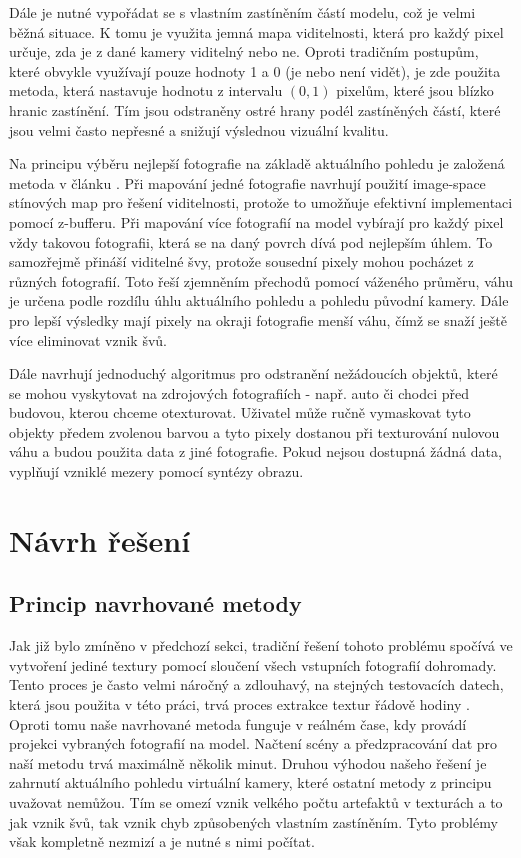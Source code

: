 \documentclass[11pt,twoside,a4paper]{book}
\begin{document}
Dále je nutné vypořádat se s vlastním zastíněním částí modelu, což je velmi
běžná situace. K tomu je využita jemná mapa viditelnosti, která pro každý pixel
určuje, zda je z dané kamery viditelný nebo ne. Oproti tradičním postupům, které
obvykle využívají pouze hodnoty 1 a 0 (je nebo není vidět), je zde použita
metoda, která nastavuje hodnotu z intervalu $(0,1)$ pixelům, které jsou blízko
hranic zastínění. Tím jsou odstraněny ostré hrany podél zastíněných částí, které
jsou velmi často nepřesné a snižují výslednou vizuální kvalitu.

Na principu výběru nejlepší fotografie na základě aktuálního pohledu je založená metoda v článku \cite{Debevec96}. Při mapování jedné fotografie navrhují použití image-space stínových map pro řešení viditelnosti, protože to umožňuje efektivní implementaci pomocí z-bufferu. Při mapování více fotografií na model vybírají pro každý pixel vždy takovou fotografii, která se na daný povrch dívá pod nejlepším úhlem. To samozřejmě přináší viditelné švy, protože sousední pixely mohou pocházet z různých fotografií. Toto řeší zjemněním přechodů pomocí váženého průměru, váhu je určena podle rozdílu úhlu aktuálního pohledu a pohledu původní kamery. Dále pro lepší výsledky mají pixely na okraji fotografie menší váhu, čímž se snaží ještě více eliminovat vznik švů.

Dále navrhují jednoduchý algoritmus pro odstranění nežádoucích objektů, které se mohou vyskytovat na zdrojových fotografiích - např. auto či chodci před budovou, kterou chceme otexturovat. Uživatel může ručně vymaskovat tyto objekty předem zvolenou barvou a tyto pixely dostanou při texturování nulovou váhu a budou použita data z jiné fotografie. Pokud nejsou dostupná žádná data, vyplňují vzniklé mezery pomocí syntézy obrazu.

\section{Návrh řešení}

\subsection{Princip navrhované metody}

Jak již bylo zmíněno v předchozí sekci, tradiční řešení tohoto problému spočívá ve vytvoření jediné textury pomocí sloučení všech vstupních fotografií dohromady. Tento proces je často velmi náročný a zdlouhavý, na stejných testovacích datech, která jsou použita v této práci, trvá proces extrakce textur řádově hodiny \cite{Kirschner08}. Oproti tomu naše navrhované metoda funguje v reálném čase, kdy provádí projekci vybraných fotografií na model. Načtení scény a předzpracování dat pro naší metodu trvá maximálně několik minut. Druhou výhodou našeho řešení je zahrnutí aktuálního pohledu virtuální kamery, které ostatní metody z principu uvažovat nemůžou. Tím se omezí vznik velkého počtu artefaktů v texturách a to jak vznik švů, tak vznik chyb způsobených vlastním zastíněním. Tyto problémy však kompletně nezmizí a je nutné s nimi počítat. 
\end{document}
